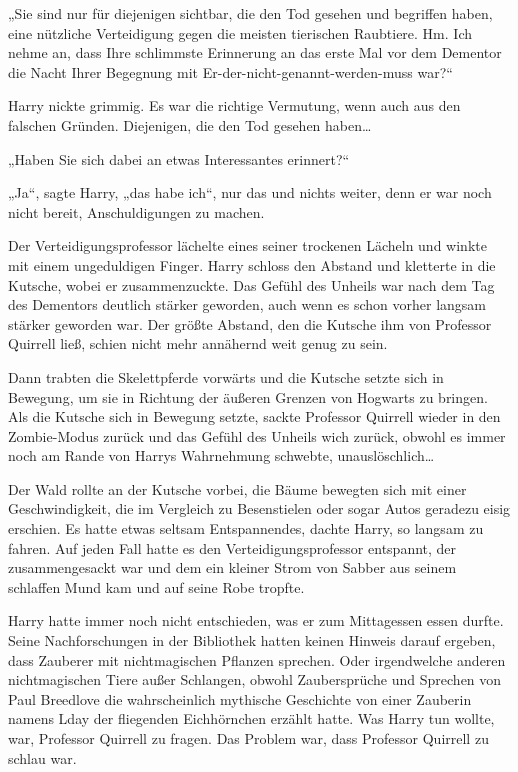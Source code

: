 {„Sie sind nur für diejenigen sichtbar, die den Tod gesehen und begriffen haben, eine nützliche Verteidigung gegen die meisten tierischen Raubtiere. Hm. Ich nehme an, dass Ihre schlimmste Erinnerung an das erste Mal vor dem Dementor die Nacht Ihrer Begegnung mit Er-der-nicht-genannt-werden-muss war?“

Harry nickte grimmig. Es war die richtige Vermutung, wenn auch aus den falschen Gründen. Diejenigen, die den Tod gesehen haben…

„Haben Sie sich dabei an etwas Interessantes erinnert?“

„Ja“, sagte Harry, „das habe ich“, nur das und nichts weiter, denn er war noch nicht bereit, Anschuldigungen zu machen.

Der Verteidigungsprofessor lächelte eines seiner trockenen Lächeln und winkte mit einem ungeduldigen Finger. Harry schloss den Abstand und kletterte in die Kutsche, wobei er zusammenzuckte. Das Gefühl des Unheils war nach dem Tag des Dementors deutlich stärker geworden, auch wenn es schon vorher langsam stärker geworden war. Der größte Abstand, den die Kutsche ihm von Professor Quirrell ließ, schien nicht mehr annähernd weit genug zu sein.

Dann trabten die Skelettpferde vorwärts und die Kutsche setzte sich in Bewegung, um sie in Richtung der äußeren Grenzen von Hogwarts zu bringen. Als die Kutsche sich in Bewegung setzte, sackte Professor Quirrell wieder in den Zombie-Modus zurück und das Gefühl des Unheils wich zurück, obwohl es immer noch am Rande von Harrys Wahrnehmung schwebte, unauslöschlich…

Der Wald rollte an der Kutsche vorbei, die Bäume bewegten sich mit einer Geschwindigkeit, die im Vergleich zu Besenstielen oder sogar Autos geradezu eisig erschien. Es hatte etwas seltsam Entspannendes, dachte Harry, so langsam zu fahren. Auf jeden Fall hatte es den Verteidigungsprofessor entspannt, der zusammengesackt war und dem ein kleiner Strom von Sabber aus seinem schlaffen Mund kam und auf seine Robe tropfte.

Harry hatte immer noch nicht entschieden, was er zum Mittagessen essen durfte. Seine Nachforschungen in der Bibliothek hatten keinen Hinweis darauf ergeben, dass Zauberer mit nichtmagischen Pflanzen sprechen. Oder irgendwelche anderen nichtmagischen Tiere außer Schlangen, obwohl Zaubersprüche und Sprechen von Paul Breedlove die wahrscheinlich mythische Geschichte von einer Zauberin namens Lday der fliegenden Eichhörnchen erzählt hatte. Was Harry tun wollte, war, Professor Quirrell zu fragen. Das Problem war, dass Professor Quirrell zu schlau war.

}
